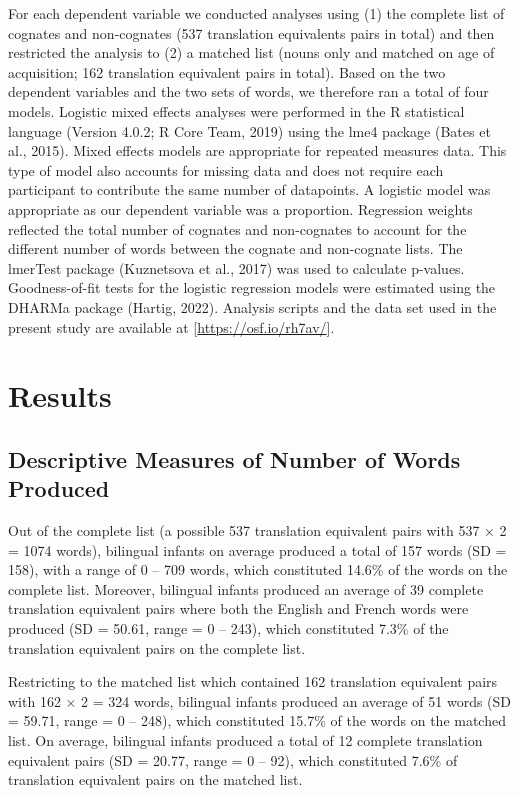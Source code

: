 \documentclass[
  ,man,floatsintext]{apa6}
\begin{document}
For each dependent variable we conducted analyses using (1) the complete list of cognates and non-cognates (537 translation equivalents pairs in total) and then restricted the analysis to (2) a matched list (nouns only and matched on age of acquisition; 162 translation equivalent pairs in total). Based on the two dependent variables and the two sets of words, we therefore ran a total of four models. Logistic mixed effects analyses were performed in the R statistical language (Version 4.0.2; R Core Team, 2019) using the lme4 package (Bates et al., 2015). Mixed effects models are appropriate for repeated measures data. This type of model also accounts for missing data and does not require each participant to contribute the same number of datapoints. A logistic model was appropriate as our dependent variable was a proportion. Regression weights reflected the total number of cognates and non-cognates to account for the different number of words between the cognate and non-cognate lists. The lmerTest package (Kuznetsova et al., 2017) was used to calculate p-values. Goodness-of-fit tests for the logistic regression models were estimated using the DHARMa package (Hartig, 2022). Analysis scripts and the data set used in the present study are available at {[}\url{https://osf.io/rh7av/}{]}.

\hypertarget{results}{%
\section{Results}\label{results}}

\hypertarget{descriptive-measures-of-number-of-words-produced}{%
\subsection{Descriptive Measures of Number of Words Produced}\label{descriptive-measures-of-number-of-words-produced}}

Out of the complete list (a possible 537 translation equivalent pairs with 537 × 2 = 1074 words), bilingual infants on average produced a total of 157 words (SD = 158), with a range of 0 -- 709 words, which constituted 14.6\% of the words on the complete list. Moreover, bilingual infants produced an average of 39 complete translation equivalent pairs where both the English and French words were produced (SD = 50.61, range = 0 -- 243), which constituted 7.3\% of the translation equivalent pairs on the complete list.

Restricting to the matched list which contained 162 translation equivalent pairs with 162 × 2 = 324 words, bilingual infants produced an average of 51 words (SD = 59.71, range = 0 -- 248), which constituted 15.7\% of the words on the matched list. On average, bilingual infants produced a total of 12 complete translation equivalent pairs (SD = 20.77, range = 0 -- 92), which constituted 7.6\% of translation equivalent pairs on the matched list.
\end{document}
